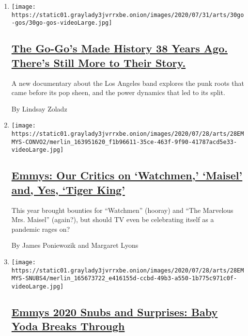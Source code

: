 \begin{enumerate}
\def\labelenumi{\arabic{enumi}.}
\item
  \texttt{[image: https://static01.graylady3jvrrxbe.onion/images/2020/07/31/arts/30go-gos/30go-gos-videoLarge.jpg]}

  \hypertarget{the-go-gos-made-history-38-years-ago-theres-still-more-to-their-story}{%
  \subsection{\texorpdfstring{\href{/2020/07/29/arts/music/the-go-gos-documentary.html}{The
  Go-Go's Made History 38 Years Ago. There's Still More to Their
  Story.}}{The Go-Go's Made History 38 Years Ago. There's Still More to Their Story.}}\label{the-go-gos-made-history-38-years-ago-theres-still-more-to-their-story}}

  A new documentary about the Los Angeles band explores the punk roots
  that came before its pop sheen, and the power dynamics that led to its
  split.

  By Lindsay Zoladz
\item
  \texttt{[image: https://static01.graylady3jvrrxbe.onion/images/2020/07/28/arts/28EMMYS-CONVO2/merlin\_163951620\_f1b96611-35ce-463f-9f90-41787acd5e33-videoLarge.jpg]}

  \hypertarget{emmys-our-critics-on-watchmen-maisel-and-yes-tiger-king}{%
  \subsection{\texorpdfstring{\href{/2020/07/28/arts/television/emmys-watchmen-handmaids-tale-tiger-king.html}{Emmys:
  Our Critics on `Watchmen,' `Maisel' and, Yes, `Tiger
  King'}}{Emmys: Our Critics on `Watchmen,' `Maisel' and, Yes, `Tiger King'}}\label{emmys-our-critics-on-watchmen-maisel-and-yes-tiger-king}}

  This year brought bounties for ``Watchmen'' (hooray) and ``The
  Marvelous Mrs. Maisel'' (again?), but should TV even be celebrating
  itself as a pandemic rages on?

  By James Poniewozik and Margaret Lyons
\item
  \texttt{[image: https://static01.graylady3jvrrxbe.onion/images/2020/07/28/arts/28EMMYS-SNUBS4/merlin\_165673722\_e416155d-ccbd-49b3-a550-1b775c971c0f-videoLarge.jpg]}

  \hypertarget{emmys-2020-snubs-and-surprises-baby-yoda-breaks-through}{%
  \subsection{\texorpdfstring{\href{/2020/07/28/arts/television/emmys-snubs-mandalorian-zendaya-reese.html}{Emmys
  2020 Snubs and Surprises: Baby Yoda Breaks
  Through}}{Emmys 2020 Snubs and Surprises: Baby Yoda Breaks Through}}\label{emmys-2020-snubs-and-surprises-baby-yoda-breaks-through}}


\end{enumerate}
